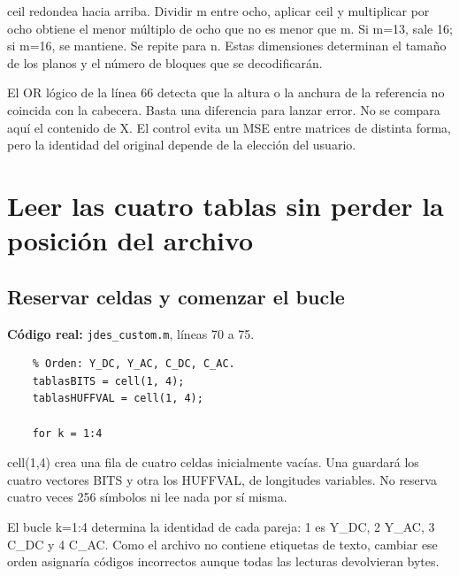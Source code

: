 \documentclass[11pt,a4paper,oneside]{report}
\begin{document}
ceil redondea hacia arriba. Dividir m entre ocho, aplicar ceil y multiplicar
por ocho obtiene el menor múltiplo de ocho que no es menor que m. Si m=13,
sale 16; si m=16, se mantiene. Se repite para n. Estas dimensiones determinan
el tamaño de los planos y el número de bloques que se decodificarán.

El OR lógico de la línea 66 detecta que la altura o la anchura de la referencia
no coincida con la cabecera. Basta una diferencia para lanzar error.
No se compara aquí el contenido de X. El control evita un MSE entre matrices
de distinta forma, pero la identidad del original depende de la elección del usuario.


\section{Leer las cuatro tablas sin perder la posición del archivo}

\par\medskip\noindent\begin{minipage}{\linewidth}

\subsection{Reservar celdas y comenzar el bucle}

\textbf{Código real:} \texttt{jdes\_custom.m}, líneas 70 a 75.

\begin{lstlisting}[firstnumber=70]
    % PASO 4: leer las cuatro especificaciones Huffman.
    % Orden: Y_DC, Y_AC, C_DC, C_AC.
    tablasBITS = cell(1, 4);
    tablasHUFFVAL = cell(1, 4);

    for k = 1:4
\end{lstlisting}

\end{minipage}\par


cell(1,4) crea una fila de cuatro celdas inicialmente vacías. Una guardará
los cuatro vectores BITS y otra los HUFFVAL, de longitudes variables.
No reserva cuatro veces 256 símbolos ni lee nada por sí misma.

El bucle k=1:4 determina la identidad de cada pareja: 1 es Y\_DC, 2 Y\_AC,
3 C\_DC y 4 C\_AC. Como el archivo no contiene etiquetas de texto, cambiar
ese orden asignaría códigos incorrectos aunque todas las lecturas devolvieran bytes.
\end{document}

